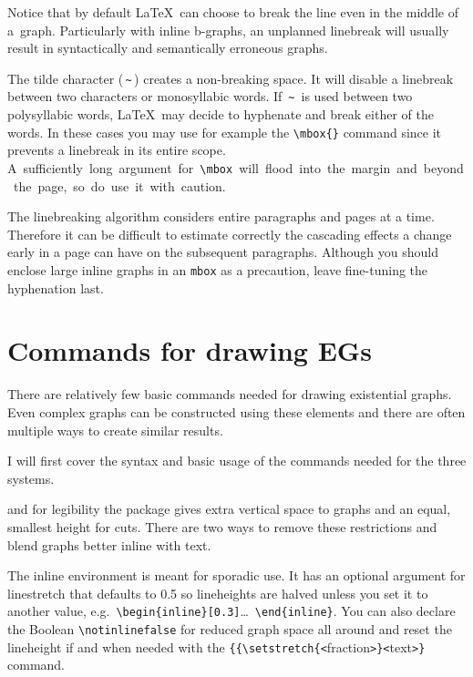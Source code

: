 \documentclass[a4paper,justified]{tufte-handout}
\newcommand{\greek}[1]{{\selectlanguage{polutonikogreek}#1\selectlanguage{english}}}
\begin{document}
Notice that by default \LaTeX\ can choose to break the line even in the middle of a~graph. Particularly with inline \greek{b}-graphs, an unplanned linebreak will usually result in syntactically and semantically erroneous graphs.

The tilde character (\,\verb|~|\,) creates a non-breaking space. It will disable a linebreak between two characters or monosyllabic words. If~\verb|~|~is used between two polysyllabic words, \LaTeX\ may decide to hyphenate and break either of the words. In these cases you may use for example the \verb|\mbox{}| command since it prevents a linebreak in its entire scope. \mbox{A sufficiently long argument for \texttt{\textbackslash{}mbox} will flood into the margin and beyond the page, so do use it with caution.}

The linebreaking algorithm considers entire paragraphs and pages at a time. Therefore it can be difficult to estimate correctly the cascading effects a change early in a page can have on the subsequent paragraphs. Although you should enclose large inline graphs in an \verb|mbox| as a precaution, leave fine-tuning the hyphenation last.

\section{\hspace*{-15pt}Commands for drawing EGs}\label{commandsforegs}
\setcounter{rheme}{0}
\debugmodefalse
\notinlinetrue
\colouredcutsfalse%

There are relatively few basic commands needed for drawing existential graphs. Even complex graphs can be constructed using these elements and there are often multiple ways to create similar results.

I will first cover the syntax and basic usage of the commands needed for the three systems.

 and for legibility the package gives extra vertical space to graphs and an equal, smallest height for cuts. There are two ways to remove these restrictions and blend graphs better inline with text.

The inline environment is meant for sporadic use. It has an optional argument for linestretch that defaults to 0.5 so lineheights are halved unless you set it to another value, e.g.\ \verb|\begin{inline}[0.3]|\dots\ \verb|\end{inline}|. You can also declare the Boolean \verb|\notinlinefalse| for reduced graph space all around and reset the lineheight if and when needed with the \verb|{{\setstretch{<|{\Fontauri fraction}\verb|>}<|{\Fontauri text}\verb|>}| command.
\end{document}
